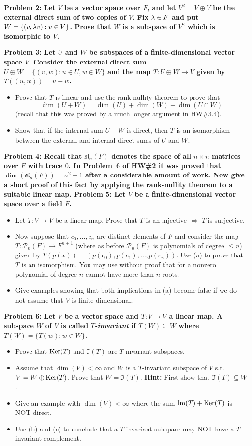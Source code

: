 \documentclass[11pt]{amsart}
\begin{document}
\noindent
\bf{Problem 2: }\rm Let $V$ be a vector space over $F$,
and let $V^2=V\oplus V$ be the external direct sum of two copies of $V$.
Fix ${\lambda}\in F$ and put $W=\{(v,{\lambda} v) : v\in V\}$. Prove that 
$W$ is a subspace of $V^2$ which is isomorphic to $V$. 

\skv
\bf{Problem 3: }\rm Let $U$ and $W$ be subspaces of a finite-dimensional 
vector space $V$.
Consider the external direct sum $U\oplus W=\{(u,w) : u\in U, w\in W\}$
and the map $T:U\oplus W\to V$ given by $T((u,w))=u+w$. 
\begin{itemize}
\item[(a)] Prove that $T$ is linear and use the rank-nullity theorem to prove that $$\dim(U+W)=\dim(U)+\dim(W)-\dim(U\cap W)$$ 
(recall that this was proved by a much longer argument in HW\#3.4).
\item[(b)] Show that if the internal sum $U+W$ is direct, then
$T$ is an isomorphism between the external and internal
direct sums of $U$ and $W$.
\end{itemize}
\skv
\bf{Problem 4: }\rm Recall that $\mathfrak{sl}_n(F)$ denotes
the space of all $n\times n$ matrices over $F$ with trace $0$.
In Problem~6 of HW\#2 it was proved that $\dim(\mathfrak{sl}_n(F))=n^2-1$
after a considerable amount of work. Now give a short proof of this
fact by applying the rank-nullity theorem to a suitable linear map.
\skv
\skv
{\bf Problem 5: }Let $V$ be a finite-dimensional vector space over a field $F$.
\begin{itemize}
\item[(a)] Let $T:V\to V$ be a linear map. Prove that $T$ is an injective $\iff$ $T$ is surjective.
\item[(b)] Now suppose that $c_0,\ldots, c_n$ are distinct elements of $F$ and consider the map
$T:\mathcal P_n(F)\to F^{n+1}$ (where as before $\mathcal P_n(F)$ is polynomials of degree $\leq n$)
given by $T(p(x))=(p(c_0),p(c_1),\ldots, p(c_n))$. Use (a) to prove that $T$ is an isomorphism.
You may use without proof that for a nonzero polynomial of degree $n$ cannot have more than $n$ roots.
\item[(c)] Give examples showing that both implications in (a) become false if we do not assume that $V$ is finite-dimensional.
\end{itemize}
\skv

\noindent
\bf{Problem 6: }\rm Let $V$ be a vector space and $T:V\to V$ a linear map.
A subspace $W$ of $V$ is called {\it $T$-invariant} if $T(W)\subseteq W$
where $T(W)=\{T(w): w\in W\}$.
\begin{itemize}
\item[(a)] Prove that ${\rm Ker}(T)$ and $\Im(T)$ are $T$-invariant subspaces.
\item[(b)] Assume that $\dim(V)<\infty$ and $W$ is a $T$-invariant subspace
of $V$ s.t. $V=W\oplus {\rm Ker}(T)$. Prove that $W=\Im(T)$. {\bf Hint:}
First show that $\Im(T)\subseteq W$.
\item[(c)] Give an example with $\dim(V)<\infty$ where the sum
${\rm Im}(T)+{\rm Ker}(T)$ is NOT direct. 
\item[(d)] Use (b) and (c) to conclude that a $T$-invariant subspace
may NOT have a $T$-invariant complement.
\end{itemize}
\end{document}
